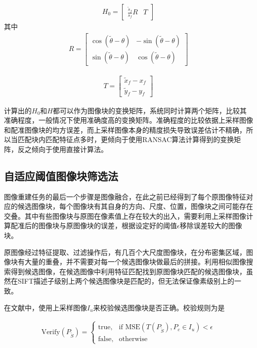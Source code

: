 \documentclass[UTF8]{csoarticle}
\begin{document}
\begin{align}
  H_0 = 
  \begin{bmatrix}
  \frac{\tilde{s}_f}{s_f} R & T
  \end{bmatrix}
\end{align}
其中
\begin{align}
  R = 
  \begin{bmatrix}
    \cos{(\tilde{\theta}-\theta)} & -\sin{(\tilde{\theta}-\theta)} \\
    \sin{(\tilde{\theta}-\theta)} & \cos{(\tilde{\theta}-\theta)} 
  \end{bmatrix}
\end{align}

\begin{align}
  T = 
  \begin{bmatrix}
    \tilde{x}_f - x_f \\
    \tilde{y}_f - y_f
  \end{bmatrix}
\end{align}

计算出的\(H_0\)和\(H\)都可以作为图像块的变换矩阵，系统同时计算两个矩阵，比较其准确程度，一般情况下使用准确度高的变换矩阵。准确程度的比较依据上采样图像和配准图像块的均方误差，而上采样图像本身的精度损失导致误差估计不精确，所以当匹配块内匹配特征点多时，更倾向于使用RANSAC算法计算得到的变换矩阵，反之倾向于使用直接计算法。

\subsection{自适应阈值图像块筛选法}
图像重建任务的最后一个步骤是图像融合，在此之前已经得到了每个原图像特征对应的候选图像块，每个图像块有其自身的方向、尺度、位置，图像块之间可能存在交叠。其中有些图像块与原图在像素值上存在较大的出入，需要利用上采样图像计算配准后的图像块与原图像块的误差，根据设定好的阈值\(\epsilon\)移除误差较大的图像块。

原图像经过特征提取、过滤操作后，有几百个大尺度图像块，在分布密集区域，图像块有大量的重叠，并不需要对每一个候选图像块做最后的拼接。利用相似图像搜索得到候选图像，在候选图像中利用特征匹配找到原图像块匹配的候选图像块，虽然在SIFT描述子级别上两个候选图像块是匹配的，但无法保证像素级别上的一致。

在文献\cite{Dai:2012vn}中，使用上采样图像\(I_u\)来校验候选图像块是否正确。校验规则为是

\begin{align}
\label{eq:errorControl}
  \text{Verify}(P_{\tilde{S}}) = 
\begin{cases} 
\text{true}, & \mbox{if MSE} (T(P_{\tilde{S}}),P_c \in I_u) < \epsilon \\
\text{false}, & \mbox{otherwise}
\end{cases}
\end{align}
\end{document}
